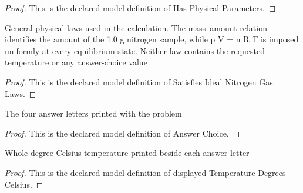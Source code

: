 \begin{proof}
  This is the declared model definition of Has Physical Parameters.
\end{proof}
\begin{definition}
  \label{def:physics:phyx-mini-0368:phyxminiproblems-problemphyxmini0368-satisfiesidealnitrogengaslaws}
  General physical laws used in the calculation. The mass--amount relation identifies the amount of the 1.0 g nitrogen sample, while p V = n R T is imposed uniformly at every equilibrium state. Neither law contains the requested temperature or any answer-choice value
\end{definition}
\begin{proof}
  This is the declared model definition of Satisfies Ideal Nitrogen Gas Laws.
\end{proof}
\begin{definition}
  \label{def:physics:phyx-mini-0368:phyxminiproblems-problemphyxmini0368-answerchoice}
  The four answer letters printed with the problem
\end{definition}
\begin{proof}
  This is the declared model definition of Answer Choice.
\end{proof}
\begin{definition}
  \label{def:physics:phyx-mini-0368:phyxminiproblems-problemphyxmini0368-displayedtemperaturedegreescelsius}
  Whole-degree Celsius temperature printed beside each answer letter
\end{definition}
\begin{proof}
  This is the declared model definition of displayed Temperature Degrees Celsius.
\end{proof}
